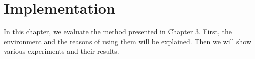 \documentclass[conference]{IEEEtran}
\begin{document}



\section{Implementation}
\label{Implementation_and_Evaluation}
In this chapter, we evaluate the method presented in Chapter 3. First, the environment and the reasons of using them will be explained. Then we will show various experiments and their results.
\end{document}
